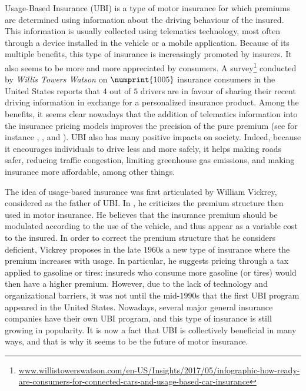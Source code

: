 \documentclass{article}
\begin{document}
Usage-Based Insurance (UBI) is a type of motor insurance for which premiums are determined using information about the driving behaviour of the insured. This information is usually collected using telematics technology, most often through a device installed in the vehicle or a mobile application. Because of its multiple benefits, this type of insurance is increasingly promoted by insurers. It also seems to be more and more appreciated by consumers. A survey\footnote{\raggedright\url{www.willistowerswatson.com/en-US/Insights/2017/05/infographic-how-ready-are-consumers-for-connected-cars-and-usage-based-car-insurance}} conducted by \emph{Willis Towers Watson} on $\numprint{1005}$ insurance consumers in the United States reports that $4$ out of $5$ drivers are in favour of sharing their recent driving information in exchange for a personalized insurance product. Among the benefits, it seems clear nowadays that the addition of telematics information into the insurance pricing models improves the precision of the pure premium (see for instance \cite{ayuso2019improving}, \cite{perez2019semi}, \cite{roel2017unraveling} and \cite{lemaire2015use}). UBI also has many positive impacts on society. Indeed, because it encourages individuals to drive less and more safely, it helps making roads safer, reducing traffic congestion, limiting greenhouse gas emissions, and making insurance more affordable, among other things.

The idea of usage-based insurance was first articulated by William Vickrey, considered as the father of UBI. In \cite{vickrey1968automobile}, he criticizes the premium structure then used in motor insurance. He believes that the insurance premium should be modulated according to the use of the vehicle, and thus appear as a variable cost to the insured. In order to correct the premium structure that he considers deficient, Vickrey proposes in the late $1960$s a new type of insurance where the premium increases with usage. In particular, he suggests pricing through a tax applied to gasoline or tires: insureds who consume more gasoline (or tires) would then have a higher premium. However, due to the lack of technology and organizational barriers, it was not until the mid-$1990$s that the first UBI program appeared in the United States. Nowadays, several major general insurance companies have their own UBI program, and this type of insurance is still growing in popularity. It is now a fact that UBI is collectively beneficial in many ways, and that is why it seems to be the future of motor insurance.
\end{document}
